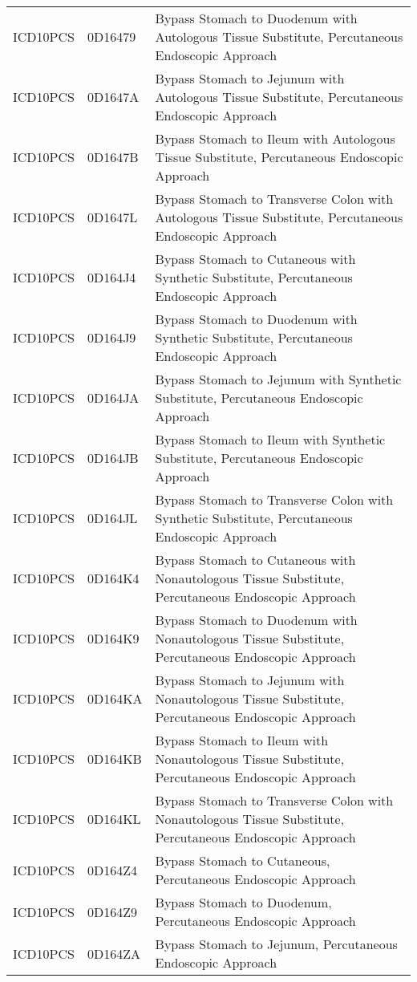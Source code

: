 \begin{longtable}{p{}p{}p{}}
  ICD10PCS & 0D16479 & Bypass Stomach to Duodenum with Autologous Tissue Substitute, Percutaneous Endoscopic Approach \\ 
  ICD10PCS & 0D1647A & Bypass Stomach to Jejunum with Autologous Tissue Substitute, Percutaneous Endoscopic Approach \\ 
  ICD10PCS & 0D1647B & Bypass Stomach to Ileum with Autologous Tissue Substitute, Percutaneous Endoscopic Approach \\ 
  ICD10PCS & 0D1647L & Bypass Stomach to Transverse Colon with Autologous Tissue Substitute, Percutaneous Endoscopic Approach \\ 
  ICD10PCS & 0D164J4 & Bypass Stomach to Cutaneous with Synthetic Substitute, Percutaneous Endoscopic Approach \\ 
  ICD10PCS & 0D164J9 & Bypass Stomach to Duodenum with Synthetic Substitute, Percutaneous Endoscopic Approach \\ 
  ICD10PCS & 0D164JA & Bypass Stomach to Jejunum with Synthetic Substitute, Percutaneous Endoscopic Approach \\ 
  ICD10PCS & 0D164JB & Bypass Stomach to Ileum with Synthetic Substitute, Percutaneous Endoscopic Approach \\ 
  ICD10PCS & 0D164JL & Bypass Stomach to Transverse Colon with Synthetic Substitute, Percutaneous Endoscopic Approach \\ 
  ICD10PCS & 0D164K4 & Bypass Stomach to Cutaneous with Nonautologous Tissue Substitute, Percutaneous Endoscopic Approach \\ 
  ICD10PCS & 0D164K9 & Bypass Stomach to Duodenum with Nonautologous Tissue Substitute, Percutaneous Endoscopic Approach \\ 
  ICD10PCS & 0D164KA & Bypass Stomach to Jejunum with Nonautologous Tissue Substitute, Percutaneous Endoscopic Approach \\ 
  ICD10PCS & 0D164KB & Bypass Stomach to Ileum with Nonautologous Tissue Substitute, Percutaneous Endoscopic Approach \\ 
  ICD10PCS & 0D164KL & Bypass Stomach to Transverse Colon with Nonautologous Tissue Substitute, Percutaneous Endoscopic Approach \\ 
  ICD10PCS & 0D164Z4 & Bypass Stomach to Cutaneous, Percutaneous Endoscopic Approach \\ 
  ICD10PCS & 0D164Z9 & Bypass Stomach to Duodenum, Percutaneous Endoscopic Approach \\ 
  ICD10PCS & 0D164ZA & Bypass Stomach to Jejunum, Percutaneous Endoscopic Approach \\ 

\end{longtable}
